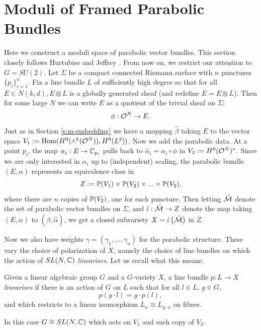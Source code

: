	\section{Moduli of Framed Parabolic Bundles}
	Here we construct a moduli space of parabolic vector bundles. This section closely follows Hurtubise and Jeffrey \cite[\S 4]{hurtubise_representations_2000}. From now on, we restrict our attention to $G=SU(2)$. Let $\Sigma$ be a compact connected Riemann surface with $n$ punctures $\{p_i\}_{i=1}^n$. Fix a line bundle $L$ of sufficiently high degree so that for all $E\in N(k,d), E\otimes L$ is a globally generated sheaf (and redefine $E = E\otimes L$). Then for some large $N$ we can write $E$ as a quotient of the trivial sheaf on $\Sigma$:
	\begin{equation}
		\phi: \mathcal{O}^N \to E.
	\end{equation}
	Just as in Section \ref{s:m-embedding} we have a mapping $\hat{\beta}$ taking $E$ to the vector space $V_1 := \text{Hom}(H^0(\wedge^k(\mathcal{O}^N)), H^0(L^2))$. Now we add the parabolic data. At a point $p_i$, the map $\alpha_i:E\to \mathbb{C}_{p_i}$ pulls back to $\hat{\alpha}_i = \alpha_i\circ \phi$ in $V_2 := H^0(\mathcal{O}^N)^\ast$. Since we are only interested in $\alpha_i$ up to (independent) scaling, the parabolic bundle $(E,\alpha)$ represents an equivalence class in
	\begin{equation}
		Z := \mathbb{P}(V_1) \times \mathbb{P}(V_2) \times ... \times \mathbb{P}(V_2),
	\end{equation}
	where there are $n$ copies of $\mathbb{P}(V_2)$, one for each puncture. Then letting $\tilde{\mathcal{M}}$ denote the set of parabolic vector bundles on $\Sigma$, and $\tilde{\iota}:\tilde{\mathcal{M}}\to Z$ denote the map taking $(E,\alpha)$ to $(\hat{\beta},\hat{\alpha})$, we get a closed subvariety $X = \tilde{\iota}\left(\tilde{\mathcal{M}}\right)$ in $Z$. 

	Now we also have weights $\gamma = (\gamma_1,...,\gamma_n)$ for the parabolic structure. These vary the choice of polarization of $X$, namely the choice of line bundles on which the action of $SL(N,\mathbb{C})$ \textit{linearises}. Let us recall what this means:
	\begin{definition}
		Given a linear algebraic group $G$ and a $G$-variety $X$, a line bundle $p:L\to X$ \emph{linearises} if there is an action of $G$ on $L$ such that for all $l\in L$, $g\in G$,
		\begin{equation}
			p(g\cdot l) = g\cdot p(l),
		\end{equation}
		and which restricts to a linear isomorphism $L_x \cong L_{g\cdot x}$ on fibres.
	\end{definition}
	In this case $G\cong SL(N,\mathbb{C})$ which acts on $V_1$ and each copy of $V_2$.
	
